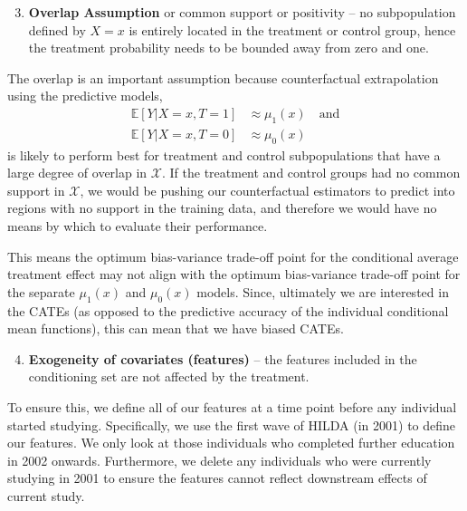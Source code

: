 \documentclass[12pt, a4paper]{article}
\begin{document}
\begin{enumerate}
  \setcounter{enumi}{2}
  \item \textbf{Overlap Assumption} or common support or positivity -- no
    subpopulation defined by $X = x$ is entirely located in the treatment or
    control group, hence the treatment probability needs to be bounded away
    from zero and one.
\end{enumerate}

The overlap is an important assumption because counterfactual extrapolation
using the predictive models, 
\begin{align}
  \mathbb{E}[Y|X{=}x, T{=}1] &\approx \mu_1(x) \quad \textrm{and} \label{eq:T1} \\
  \mathbb{E}[Y|X{=}x, T{=}0] &\approx \mu_0(x) \label{eq:T0}
\end{align}
is likely to perform best for treatment and control subpopulations that have a
large degree of overlap in $\mathcal{X}$. If the treatment and control groups
had no common support in $\mathcal{X}$, we would be pushing our counterfactual
estimators to predict into regions with no support in the training data, and
therefore we would have no means by which to evaluate their performance.

This means the optimum bias-variance trade-off point for the conditional
average treatment effect may not align with the optimum bias-variance trade-off
point for the separate $\mu_1(x)$ and $\mu_0(x)$ models. Since, ultimately we
are interested in the CATEs (as opposed to the predictive accuracy of the
individual conditional mean functions), this can mean that we have biased
CATEs.

\begin{enumerate}
  \setcounter{enumi}{3}
  \item \textbf{Exogeneity of covariates (features)} -- the features included in the conditioning set are not affected by the treatment. 
\end{enumerate}

To ensure this, we define all of our features at a time point before any
individual started studying. Specifically, we use the first wave of HILDA (in
2001) to define our features. We only look at those individuals who completed
further education in 2002 onwards. Furthermore, we delete any individuals who
were currently studying in 2001 to ensure the features cannot reflect
downstream effects of current study. 
\end{document}
